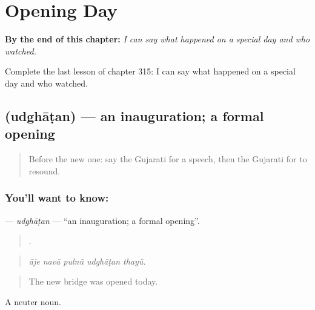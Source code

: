 
\chapter{Opening Day}
\label{ch:gu-opening-day}

\begin{chapteropening}
\textbf{By the end of this chapter:} \emph{I can say what happened on a special day and who watched.}

Complete the last lesson of chapter 315: I can say what happened on a special day and who watched.
\end{chapteropening}

\section[\texorpdfstring{\gu{ઉદ્ઘાટન} (udghāṭan)}{ઉદ્ઘાટન (udghāṭan)}]{ (udghāṭan) — an inauguration; a formal opening}

\label{lesson:GU-C315-udghatan}



\begin{quote}
Before the new one: say the Gujarati for a speech, then the Gujarati for to resound.
\end{quote}

\subsection*{You'll want to know: }
\textbf{} — \emph{udghāṭan} — \textquotedblleft{}an inauguration; a formal opening\textquotedblright{}.

\begin{quote}
    .
\end{quote}

\begin{quote}
\emph{āje navā pulnũ udghāṭan thayũ.}
\end{quote}

\begin{quote}
The new bridge was opened today.
\end{quote}

A neuter noun.

